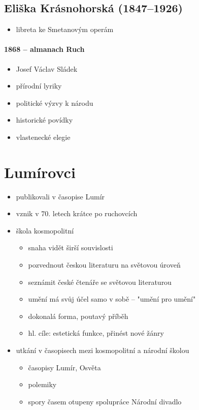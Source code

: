 \subsection{Eliška Krásnohorská (1847--1926)}
\begin{itemize}
\item libreta ke Smetanovým operám
\end{itemize}

\paragraph{1868 -- almanach Ruch}
\begin{itemize}
\item Josef Václav Sládek
\item přírodní lyriky
\item politické výzvy k národu
\item historické povídky
\item vlastenecké elegie
\end{itemize}

\section{Lumírovci}
\begin{itemize}
\item publikovali v časopise Lumír
\item vznik v 70. letech krátce po ruchovcích
\item škola kosmopolitní
	\begin{itemize}
	\item snaha vidět širší souvislosti
	\item pozvednout českou literaturu na světovou úroveň
	\item seznámit české čtenáře se světovou literaturou
	\item umění má svůj účel samo v sobě -- "umění pro umění"
	\item dokonalá forma, poutavý příběh
	\item hl. cíle: estetická funkce, přinést nové žánry
	\end{itemize}
\item utkání v časopisech mezi kosmopolitní a národní školou
	\begin{itemize}
	\item časopisy Lumír, Osvěta
	\item polemiky
	\item spory časem otupeny \ra spolupráce \ra Národní divadlo
	\end{itemize}
\end{itemize}

